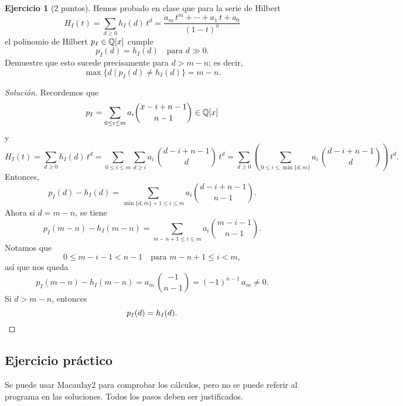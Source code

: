 \documentclass{article}
\theoremstyle{definition}
\newtheorem{ejerc}{Ejercicio}
\newenvironment{solucion}{\begin{proof}[Solución]}{\end{proof}}
\begin{document}
\begin{ejerc}[2 puntos]
  Hemos probado en clase que para la serie de Hilbert
  \[ H_I (t) = \sum_{d\ge 0} h_I (d)\,t^d =
    \frac{a_m\,t^m + \cdots + a_1\,t + a_0}{(1-t)^n} \]
  el polinomio de Hilbert $p_I \in \mathbb{Q} [x]$ cumple
  $$p_I (d) = h_I (d) \quad\text{para }d\gg 0.$$
  Demuestre que esto sucede precisamente para $d > m-n$; es decir,
  $$\max \{ d \mid p_I (d) \ne h_I (d) \} = m-n.$$

  \ifdefined\solutions\begin{solucion}
    Recordemos que
    $$p_I = \sum_{0 \le i \le m} a_i {x - i + n - 1 \choose n-1} \in \mathbb{Q} [x]$$
    y
    \[ H_I (t) =
       \sum_{d \ge 0} h_I (d)\,t^d =
       \sum_{0 \le i \le m} \sum_{d \ge i} a_i\,{d - i + n - 1 \choose d}\,t^d =
       \sum_{d\ge 0} \left(\sum_{0 \le i \le \min \{d,m\}} a_i\,{d - i + n - 1 \choose d}\right)\,t^d. \]
    Entonces,
    $$p_I (d) - h_I (d) = \sum_{\min \{ d,m \} + 1 \le i \le m} a_i {d - i + n - 1 \choose n-1}.$$
    Ahora si $d = m-n$, se tiene
    $$p_I (m-n) - h_I (m-n) = \sum_{m-n+1 \le i \le m} a_i {m - i - 1 \choose n-1}.$$
    Notamos que
    $$0 \le m - i - 1 < n-1 \quad\text{para }m-n + 1 \le i < m,$$
    así que nos queda
    $$p_I (m-n) - h_I (m-n) = a_m\,{- 1 \choose n-1} = (-1)^{n-1}\,a_m \ne 0.$$
    Si $d > m-n$, entonces
    \[ p_I (d) = h_I (d). \qedhere \]
  \end{solucion}\fi
\end{ejerc}

\subsection*{Ejercicio práctico}

Se puede usar Macaulay2 para comprobar los cálculos, pero no se puede referir al
programa en las soluciones. Todos los pasos deben ser justificados.
\end{document}
